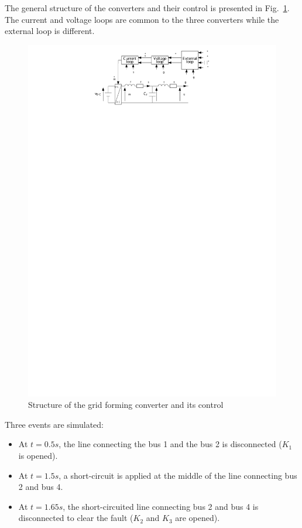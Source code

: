 \documentclass[a4paper, 12pt]{report}
\begin{document}
The general structure of the converters and their control is presented in Fig.~\ref{GFGeneral}. The current and voltage loops are common to the three converters while the external loop is different.
\begin{figure}[htbp]
\begin{center}
\includegraphics[width=\textwidth]{Schema_Structure_Grid_Forming_and_Control_General}
\end{center}
\caption{Structure of the grid forming converter and its control\label{GFGeneral}}
\end{figure}
Three events are simulated:
\begin{itemize}
\item At $t = 0.5s$, the line connecting the bus 1 and the bus 2 is disconnected ($K_1$ is opened).
\item At $t = 1.5s$, a short-circuit is applied at the middle of the line connecting bus 2 and bus 4.
\item At $t = 1.65s$, the short-circuited line connecting bus 2 and bus 4 is disconnected to clear the fault ($K_2$ and $K_3$ are opened).
\end{itemize}
\end{document}
